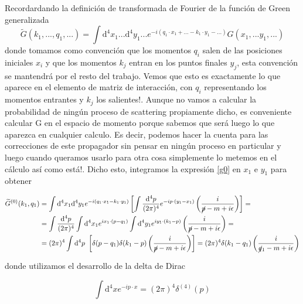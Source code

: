 \documentclass[tickz]{article}
\numberwithin{equation}{section}
\begin{document}
Recordardando la definición de transformada de Fourier de la función
de Green generalizada
\begin{equation}
\widetilde{G}(k_{1},...,q_{1},...)=\int \mathrm{\mathrm{d^4}}x_{1}...\mathrm{\mathrm{d^4}}y_{1}...e^{-i(q_{1}\cdot x_{1} +... - k_{1}\cdot y_{1}-...)}G(x_{1},...y_{1},...) 
\end{equation}
donde tomamos como convención que los momentos $ q_i $ salen de las posiciones iniciales $ x_i $ y que los momentos $ k_j $ entran en los puntos finales $ y_j $, esta convención se mantendrá por el resto del trabajo. 
Vemos que esto es exactamente lo que aparece en el elemento de matriz
de interacción, con $q_{i}$ representando los momentos entrantes
y $k_{j}$ los salientes!. Aunque no vamos a calcular
la probabilidad de ningún proceso de scattering propiamente dicho, es conveniente calcular G en el
espacio de momento porque sabemos que será luego lo que aparezca en
cualquier calculo. Es decir, podemos hacer la cuenta para las correcciones
de este propagador sin pensar en ningún proceso en particular y luego
cuando queramos usarlo para otra cosa simplemente lo metemos en el
cálculo así como está!. Dicho esto, integramos la expresión \ref{g0} en
$x_{1}$ e $y_{1}$ para obtener

\begin{equation}\label{g0fourier}
\begin{aligned}
\widetilde{G}^{(0)}(k_{1},q_{1})&= \int \mathrm{\mathrm{d^4}}x_{1}\mathrm{\mathrm{d^4}}y_{1} e^{-i(q_1\cdot x_1 - k_1\cdot y_1)}\left[ \int\frac{\mathrm{d^4}p}{(2\pi)^{4}}e^{-ip\cdot(y_{1}-x_{1})}\left(\frac{i}{\cancel{p}-m+i\epsilon}\right) \right] =\\
&=\int\frac{\mathrm{d^4}p}{(2\pi)^{4}} \int \mathrm{d^4}x_{1} e^{ix_1\cdot(p-q_1)} \int \mathrm{d^4}y_{1} e^{iy_1\cdot(k_1-p)} \left(\frac{i}{\cancel{p}-m+i\epsilon}\right) =\\
&=(2\pi)^{4}\int \mathrm{d^4}p \ \left[\delta(p-q_{1})\delta(k_1-p)\left(\frac{i}{\cancel{p}-m+i\epsilon}\right)\right]=(2\pi)^{4}\delta(k_{1}-q_{1})\left(\frac{i}{\cancel{q}_{1}-m+i\epsilon}\right)
\end{aligned}
\end{equation}

donde utilizamos el desarrollo de la delta de Dirac

\begin{equation}\label{key}
\int \mathrm{d^4}x e^{-ip \cdot x} = \left(2 \pi\right)^4 \delta^{(4)}(p)
\end{equation}
\end{document}
